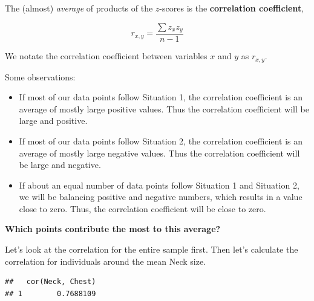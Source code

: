 \documentclass[
]{book}
\newenvironment{Shaded}{\begin{snugshade}}{\end{snugshade}}
\newcommand{\CommentTok}[1]{\textcolor[rgb]{0.56,0.35,0.01}{\textit{#1}}}
\newcommand{\DecValTok}[1]{\textcolor[rgb]{0.00,0.00,0.81}{#1}}
\newcommand{\KeywordTok}[1]{\textcolor[rgb]{0.13,0.29,0.53}{\textbf{#1}}}
\newcommand{\NormalTok}[1]{#1}
\newcommand{\OperatorTok}[1]{\textcolor[rgb]{0.81,0.36,0.00}{\textbf{#1}}}
\newcommand{\StringTok}[1]{\textcolor[rgb]{0.31,0.60,0.02}{#1}}
\providecommand{\tightlist}{%
  \setlength{\itemsep}{0pt}\setlength{\parskip}{0pt}}
\begin{document}
The (almost) \emph{average} of products of the \(z\)-scores is the \textbf{correlation coefficient},

\[ r_{x,y} = \frac{\sum z_x z_y}{n-1} \]

We notate the correlation coefficient between variables \(x\) and \(y\) as \(r_{x,y}\).

Some observations:

\begin{itemize}
\tightlist
\item
  If most of our data points follow Situation 1, the correlation coefficient is an average of mostly large positive values. Thus the correlation coefficient will be large and positive.
\item
  If most of our data points follow Situation 2, the correlation coefficient is an average of mostly large negative values. Thus the correlation coefficient will be large and negative.
\item
  If about an equal number of data points follow Situation 1 and Situation 2, we will be balancing positive and negative numbers, which results in a value close to zero. Thus, the correlation coefficient will be close to zero.
\end{itemize}

\textbf{Which points contribute the most to this average?}

Let's look at the correlation for the entire sample first. Then let's calculate the correlation for individuals around the mean Neck size.

\begin{Shaded}
\end{Shaded}

\begin{verbatim}
##   cor(Neck, Chest)
## 1        0.7688109
\end{verbatim}

\begin{Shaded}
\end{Shaded}
\end{document}
